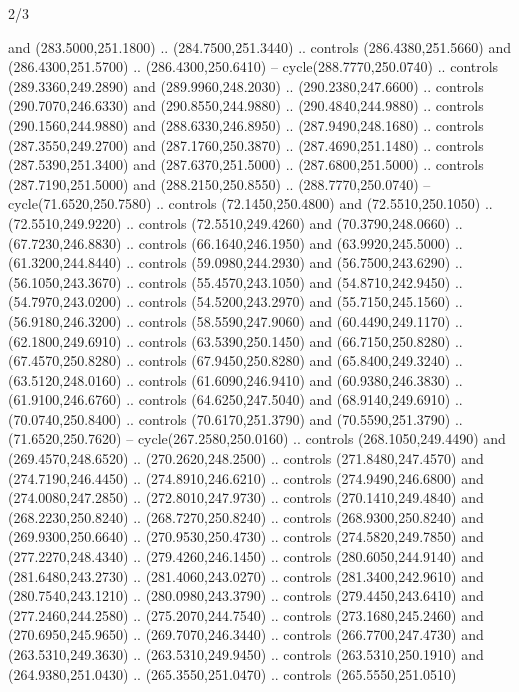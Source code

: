 \begin{flagdescription}{2/3}
\begin{scope}[xshift=0.5\flaglength,yshift=0.5\flagwidth,scale=\stretchfactor]
\begin{scope}[scale=0.001645\flagwidth,yshift=65mm,xshift=-63mm]
\begin{scope}[y=0.80pt, x=0.80pt, yscale=-1,]
\begin{scope}[cm={{1.33333,0.0,0.0,1.33333,(0.0,1e-05)}}]
  and (283.5000,251.1800) .. (284.7500,251.3440) .. controls (286.4380,251.5660)
  and (286.4300,251.5700) .. (286.4300,250.6410) -- cycle(288.7770,250.0740) ..
  controls (289.3360,249.2890) and (289.9960,248.2030) .. (290.2380,247.6600) ..
  controls (290.7070,246.6330) and (290.8550,244.9880) .. (290.4840,244.9880) ..
  controls (290.1560,244.9880) and (288.6330,246.8950) .. (287.9490,248.1680) ..
  controls (287.3550,249.2700) and (287.1760,250.3870) .. (287.4690,251.1480) ..
  controls (287.5390,251.3400) and (287.6370,251.5000) .. (287.6800,251.5000) ..
  controls (287.7190,251.5000) and (288.2150,250.8550) .. (288.7770,250.0740) --
  cycle(71.6520,250.7580) .. controls (72.1450,250.4800) and (72.5510,250.1050)
  .. (72.5510,249.9220) .. controls (72.5510,249.4260) and (70.3790,248.0660) ..
  (67.7230,246.8830) .. controls (66.1640,246.1950) and (63.9920,245.5000) ..
  (61.3200,244.8440) .. controls (59.0980,244.2930) and (56.7500,243.6290) ..
  (56.1050,243.3670) .. controls (55.4570,243.1050) and (54.8710,242.9450) ..
  (54.7970,243.0200) .. controls (54.5200,243.2970) and (55.7150,245.1560) ..
  (56.9180,246.3200) .. controls (58.5590,247.9060) and (60.4490,249.1170) ..
  (62.1800,249.6910) .. controls (63.5390,250.1450) and (66.7150,250.8280) ..
  (67.4570,250.8280) .. controls (67.9450,250.8280) and (65.8400,249.3240) ..
  (63.5120,248.0160) .. controls (61.6090,246.9410) and (60.9380,246.3830) ..
  (61.9100,246.6760) .. controls (64.6250,247.5040) and (68.9140,249.6910) ..
  (70.0740,250.8400) .. controls (70.6170,251.3790) and (70.5590,251.3790) ..
  (71.6520,250.7620) -- cycle(267.2580,250.0160) .. controls (268.1050,249.4490)
  and (269.4570,248.6520) .. (270.2620,248.2500) .. controls (271.8480,247.4570)
  and (274.7190,246.4450) .. (274.8910,246.6210) .. controls (274.9490,246.6800)
  and (274.0080,247.2850) .. (272.8010,247.9730) .. controls (270.1410,249.4840)
  and (268.2230,250.8240) .. (268.7270,250.8240) .. controls (268.9300,250.8240)
  and (269.9300,250.6640) .. (270.9530,250.4730) .. controls (274.5820,249.7850)
  and (277.2270,248.4340) .. (279.4260,246.1450) .. controls (280.6050,244.9140)
  and (281.6480,243.2730) .. (281.4060,243.0270) .. controls (281.3400,242.9610)
  and (280.7540,243.1210) .. (280.0980,243.3790) .. controls (279.4450,243.6410)
  and (277.2460,244.2580) .. (275.2070,244.7540) .. controls (273.1680,245.2460)
  and (270.6950,245.9650) .. (269.7070,246.3440) .. controls (266.7700,247.4730)
  and (263.5310,249.3630) .. (263.5310,249.9450) .. controls (263.5310,250.1910)
  and (264.9380,251.0430) .. (265.3550,251.0470) .. controls (265.5550,251.0510)

\end{scope}
\end{scope}
\end{scope}
\end{scope}
\end{flagdescription}
